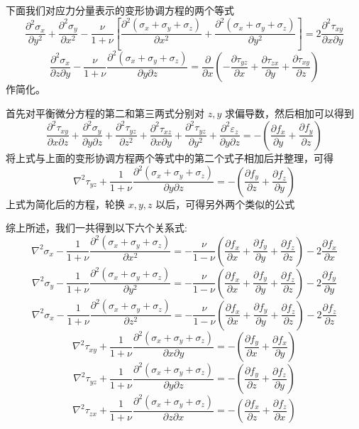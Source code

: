 \documentclass[12pt,a4paper]{article}
\begin{document}
下面我们对应力分量表示的变形协调方程的两个等式
$$
\frac{\partial^2 \sigma_x}{\partial y^2}+\frac{\partial^2 \sigma_y}{\partial x^2}-\frac{\nu}{1+\nu}\left[\frac{\partial^2 (\sigma_x+\sigma_y+\sigma_z)}{\partial x^2}+\frac{\partial^2 (\sigma_x+\sigma_y+\sigma_z)}{\partial y^2}\right]=2\frac{\partial^2 \tau_{xy}}{\partial x\partial y}
$$
$$
\frac{\partial^2 \sigma_x}{\partial z\partial y}-\frac{\nu}{1+\nu}\frac{\partial^2 (\sigma_x+\sigma_y+\sigma_z)}{\partial y\partial z}=\frac{\partial}{\partial x}(-\frac{\partial\tau_{yz}}{\partial x}+\frac{\partial\tau_{zx}}{\partial y}+\frac{\partial\tau_{xy}}{\partial z})
$$
作简化。

首先对平衡微分方程的第二和第三两式分别对 $z,y$ 求偏导数，然后相加可以得到
$$
\frac{\partial^2 \tau_{xy}}{\partial x\partial z}+\frac{\partial^2 \sigma_y}{\partial y\partial z}+\frac{\partial^2 \tau_{yz}}{\partial z^2}+\frac{\partial^2 \tau_{xz}}{\partial x\partial y}+\frac{\partial^2 \tau_{yz}}{\partial y^2}+\frac{\partial^2 \varepsilon_z}{\partial y\partial z}=-(\frac{\partial f_x}{\partial y}+\frac{\partial f_y}{\partial z})
$$
将上式与上面的变形协调方程两个等式中的第二个式子相加后并整理，可得
$$
\nabla^2\tau_{yz}+\frac{1}{1+\nu}\frac{\partial^2 (\sigma_x+\sigma_y+\sigma_z)}{\partial y\partial z}=-(\frac{\partial f_y}{\partial z}+\frac{\partial f_z}{\partial y})
$$
上式为简化后的方程，轮换 $x,y,z$ 以后，可得另外两个类似的公式

综上所述，我们一共得到以下六个关系式:
$$
\nabla^2\sigma_x-\frac{1}{1+\nu}\frac{\partial^2 (\sigma_x+\sigma_y+\sigma_z)}{\partial x^2}=-\frac{\nu}{1-\nu}(\frac{\partial f_x}{\partial x}+\frac{\partial f_y}{\partial y}+\frac{\partial f_z}{\partial z})-2\frac{\partial f_x}{\partial x}
$$
$$
\nabla^2\sigma_y-\frac{1}{1+\nu}\frac{\partial^2 (\sigma_x+\sigma_y+\sigma_z)}{\partial y^2}=-\frac{\nu}{1-\nu}(\frac{\partial f_x}{\partial x}+\frac{\partial f_y}{\partial y}+\frac{\partial f_z}{\partial z})-2\frac{\partial f_y}{\partial y}
$$
$$
\nabla^2\sigma_x-\frac{1}{1+\nu}\frac{\partial^2 (\sigma_x+\sigma_y+\sigma_z)}{\partial z^2}=-\frac{\nu}{1-\nu}(\frac{\partial f_x}{\partial x}+\frac{\partial f_y}{\partial y}+\frac{\partial f_z}{\partial z})-2\frac{\partial f_z}{\partial z}
$$
$$
\nabla^2\tau_{xy}+\frac{1}{1+\nu}\frac{\partial^2 (\sigma_x+\sigma_y+\sigma_z)}{\partial x\partial y}=-(\frac{\partial f_y}{\partial x}+\frac{\partial f_x}{\partial y})
$$
$$
\nabla^2\tau_{yz}+\frac{1}{1+\nu}\frac{\partial^2 (\sigma_x+\sigma_y+\sigma_z)}{\partial y\partial z}=-(\frac{\partial f_y}{\partial z}+\frac{\partial f_z}{\partial y})
$$
$$
\nabla^2\tau_{zx}+\frac{1}{1+\nu}\frac{\partial^2 (\sigma_x+\sigma_y+\sigma_z)}{\partial z\partial x}=-(\frac{\partial f_x}{\partial z}+\frac{\partial f_z}{\partial x})
$$
\end{document}
